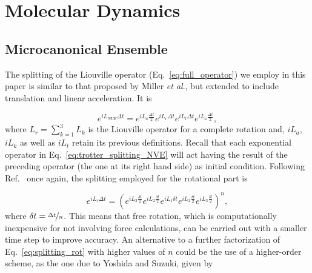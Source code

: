 \documentclass[aip,jcp,reprint,amsmath,amssymb]{revtex4-1}
\begin{document}
\section{Molecular Dynamics}
\label{sec:moleculardynamics}

\subsection{Microcanonical Ensemble}

The splitting of the Liouville operator (Eq.~\ref{eq:full_operator}) we employ in this paper is similar to that proposed by Miller \textit{et al}.\cite{Miller2002}, but extended to include translation and linear acceleration. It is

\begin{equation}
\label{eq:trotter_splitting_NVE}
e^{i L_{NVE} \Delta t} = e^{i L_a \frac{\Delta t}{2}} e^{i L_r \Delta t} e^{i L_t \Delta t} e^{i L_a \frac{\Delta t}{2}},
\end{equation}
where $L_r = \sum_{k=1}^3 L_k$ is the Liouville operator for a complete rotation and, $i L_a $, $i L_k $ as well as $i L_t $ retain its previous definitions. Recall that each exponential operator in Eq.~\ref{eq:trotter_splitting_NVE} will act having the result of the preceding operator (the one at its right hand side) as initial condition. Following Ref.~ once again, the splitting employed for the rotational part is\cite{Tuckerman1992}

\begin{equation}
\label{eq:splitting_rot}
e^{i L_r \Delta t} = \left( e^{i L_3 \frac{\delta t}{2}} e^{i L_2 \frac{\delta t}{2}} e^{i L_1 \delta t} e^{i L_2 \frac{\delta t}{2}} e^{i L_3 \frac{\delta t}{2}} \right)^n,
\end{equation}
where $\delta t = \nicefrac{\Delta t}{n}$. This means that free rotation, which is computationally inexpensive for not involving force calculations, can be carried out with a smaller time step to improve accuracy. An alternative to a further factorization of Eq.~\ref{eq:splitting_rot} with higher values of $n$ could be the use of a higher-order scheme, as the one due to Yoshida \cite{Yoshida1990} and Suzuki\cite{Suzuki1991a,Suzuki1991b}, given by
 
\end{document}
